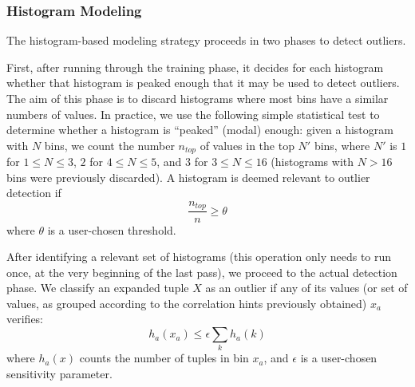\subsubsection{Histogram Modeling}
The histogram-based modeling strategy proceeds in two phases to detect outliers. 

First, after running through the training phase, it decides for each histogram whether that histogram is peaked enough that it may be used to detect outliers. The aim of this phase is to discard histograms where most bins have a similar numbers of values. In practice, we use the following simple statistical test to determine whether a histogram is ``peaked'' (modal) enough: given a histogram with $N$ bins, we count the number $n_{top}$ of values in the top $N'$ bins, where $N'$ is $1$ for $1 \leq N \leq 3$, $2$ for $4 \leq N \leq 5$, and $3$ for $3 \leq N \leq 16$ (histograms with $N > 16$ bins were previously discarded). A histogram is deemed relevant to outlier detection if
\begin{equation}
 \frac{n_{top}}{n} \geq \theta 
\end{equation}
where $\theta$ is a user-chosen threshold. 

After identifying a relevant set of histograms (this operation only needs to run once, at the very beginning of the last pass), we proceed to the actual detection phase. We classify an expanded tuple $X$ as an outlier if any of its values (or set of values, as grouped according to the correlation hints previously obtained) $x_a$ verifies:
\begin{equation}
h_a(x_a) \le \epsilon \sum_k h_a(k)
\end{equation}
where $h_a(x)$ counts the number of tuples in bin $x_a$, and $\epsilon$ is a user-chosen sensitivity parameter.
